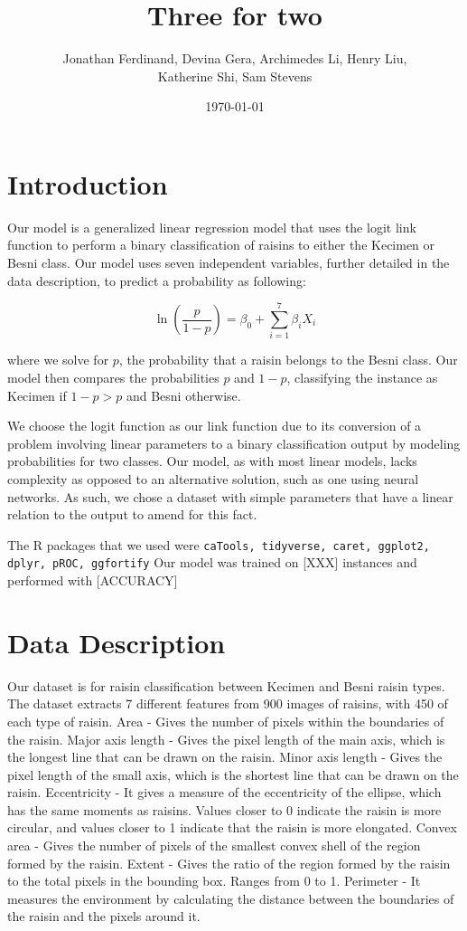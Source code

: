 \documentclass{article}
\title{Three for two}
\author{Jonathan Ferdinand, Devina Gera, Archimedes Li, Henry Liu, \\Katherine Shi, Sam Stevens}
\date{\today}
\begin{document}
\maketitle

\section{Introduction}
Our model is a generalized linear regression model that uses the logit link function to perform a binary classification of raisins to either the Kecimen or Besni class. Our model uses seven independent variables, further detailed in the data description, to predict a probability as following:

$$\ln \left( \frac{p}{1-p}\right) = \beta_0 + \sum_{i=1}^{7} \beta_i X_i$$

where we solve for $p$, the probability that a raisin belongs to the Besni class. Our model then compares the probabilities $p$ and $1-p$, classifying the instance as Kecimen if $1-p > p$ and Besni otherwise.

We choose the logit function as our link function due to its conversion of a problem involving linear parameters to a binary classification output by modeling probabilities for two classes. Our model, as with most linear models, lacks complexity as opposed to an alternative solution, such as one using neural networks. As such, we chose a dataset with simple parameters that have a linear relation to the output to amend for this fact.

The R packages that we used were
\texttt{caTools, tidyverse, caret, ggplot2, dplyr, pROC, ggfortify}
Our model was trained on [XXX] instances and performed with [ACCURACY]%

\section{Data Description}
Our dataset is for raisin classification between Kecimen and Besni raisin types.  The dataset extracts 7 different features from 900 images of raisins, with 450 of each type of raisin.
Area - Gives the number of pixels within the boundaries of the raisin.
Major axis length - Gives the pixel length of the main axis, which is the longest line that can be drawn on the raisin.
Minor axis length - Gives the pixel length of the small axis, which is the shortest line that can be drawn on the raisin.
Eccentricity - It gives a measure of the eccentricity of the ellipse, which has the same moments as raisins.  Values closer to 0 indicate the raisin is more circular, and values closer to 1 indicate that the raisin is more elongated.
Convex area - Gives the number of pixels of the smallest convex shell of the region formed by the raisin.
Extent - Gives the ratio of the region formed by the raisin to the total pixels in the bounding box.  Ranges from 0 to 1.
Perimeter - It measures the environment by calculating the distance between the boundaries of the raisin and the pixels around it.
\end{document}
